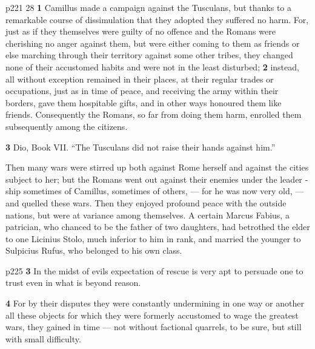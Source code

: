 p221
28
\textbf{1} Camillus made a campaign against the Tusculans, but thanks to a remarkable course of dissimulation that they adopted they suffered no harm. For, just as if they themselves were guilty of no offence and the Romans were cherishing no anger against them, but were either coming to them as friends or else marching through their territory against some other tribes, they changed none of their accustomed habits and were not in the least disturbed; \textbf{2} instead, all without exception remained in their places, at their regular trades or occupations, just as in time of peace, and receiving the army within their borders, gave them hospitable gifts, and in other ways honoured them like friends. Consequently the Romans, so far from doing them harm, enrolled them subsequently among the citizens.

\textbf{3}
Dio, Book VII. ``The Tusculans did not raise their hands against him.''

Then many wars were stirred up both against Rome herself and against the cities subject to her; but the Romans went out against their enemies under the leader ­ship sometimes of Camillus, sometimes of others, \texthebrew{—} for he was now very old, \texthebrew{—} and quelled these wars. Then they enjoyed profound peace with the outside nations, but were at variance among themselves. A certain Marcus Fabius, a patrician, who chanced to be the father of two daughters, had betrothed the elder to one Licinius Stolo, much inferior to him in rank, and married the younger to Sulpicius Rufus, who belonged to his own class.

p225
\textbf{3}
In the midst of evils expectation of rescue is very apt to persuade one to trust even in what is beyond reason.

\textbf{4}
For by their disputes they were constantly undermining in one way or another all these objects for which they were formerly accustomed to wage the greatest wars, they gained in time \texthebrew{—} not without factional quarrels, to be sure, but still with small difficulty.

